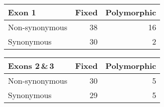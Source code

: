 \documentclass[12pt, addpoints, hidelinks]{exam}
\begin{document}
\begin{multicols}{2}
\begin{tabular}{@{}lrr@{}}
\toprule
Exon 1 & Fixed & Polymorphic \\
\midrule
Non-synonymous	&	38 	&	16 	\\
Synonymous		&	30 	&	2	\\
\bottomrule
\end{tabular}


\columnbreak

\begin{tabular}{@{}lrr@{}}
\toprule
Exons 2\,\&\,3 & Fixed & Polymorphic \\
\midrule
Non-synonymous	&	30 	&	5 	\\
Synonymous		&	29 	&	5	\\
\bottomrule
\end{tabular}

\end{multicols}
\end{document}
